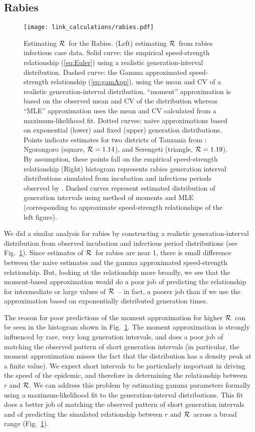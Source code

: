 \documentclass[12pt]{article}
\newcommand{\RR}{\ensuremath{{\cal R}}}
\newcommand{\eref}[1]{(\ref{eq:#1})}
\newcommand{\fref}[1]{Fig.~\ref{fig:#1}}
\begin{document}
\subsection{Rabies}
\label{Rabies_example}

\begin{figure}[htbp] \centering
	\texttt{[image: link\_calculations/rabies.pdf]}
	\caption{Estimating \RR~for the Rabies.
	    (Left) estimating \RR~from rabies infectious case data.
		Solid curve: the empirical speed-strength relationship \eref{Euler} using a realistic generation-interval distribution.
Dashed curve: the Gamma approximated speed-strength relationship \eref{gamApp}, using the mean and CV of a realistic generation-interval distribution. 
        ``moment'' approximation is based on the observed mean and CV of the distribution whereas ``MLE'' approximation uses the mean and CV calculated from a maximum-likelihood fit.
		Dotted curves: naive approximations based on exponential (lower) and fixed (upper) generation distributions.
		Points indicate estimates for two districts of Tanzania from \cite{HampDush09}: {Ngorongoro (square, $\RR=1.14$), and Serengeti (triangle, $\RR=1.19$). By assumption, these points fall on the empirical speed-strength relationship}
		(Right) histogram represents rabies generation interval distributions simulated from incubation and infectious periods observed by \cite{HampDush09}.
		Dashed curves represent estimated distribution of generation intervals using method of moments and MLE (corresponding to approximate speed-strength relationships of the left figure). 
	}
	\label{fig:rabiesCurve}
\end{figure}

We did a similar analysis for rabies by constructing a realistic generation-interval distribution from observed incubation and infectious period distributions (see \fref{rabiesCurve}).
Since estimates of \RR\ for rabies are near 1, there is small difference between the naive estimates and the gamma approximated speed-strength relationship. 
But, looking at the relationship more broadly, we see that the moment-based approximation would do a poor job of predicting the relationship for intermediate or large values of \RR\ -- in fact, a poorer job than if we use the approximation based on exponentially distributed generation times. 

The reason for poor predictions of the moment approximation for higher \RR\ can be seen in the histogram shown in \fref{rabiesCurve}. The moment approximation is strongly influenced by rare, very long generation intervals, and does a poor job of matching the observed pattern of short generation intervals (in particular, the moment approximation misses the fact that the distribution has a density peak at a finite value). We expect short intervals to be particularly important in driving the speed of the epidemic, and therefore in determining the relationship between $r$ and \RR. We can address this problem by estimating gamma parameters formally using a maximum-likelihood fit to the generation-interval distributions. This fit does a better job of matching the observed pattern of short generation intervals and of predicting the simulated relationship between $r$ and \RR\ across a broad range (\fref{rabiesCurve}).
\end{document}
